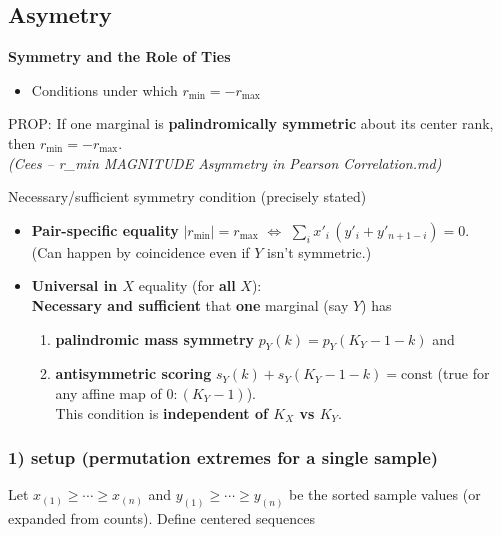 \documentclass[
  12pt,
]{article}
\providecommand{\tightlist}{%
  \setlength{\itemsep}{0pt}\setlength{\parskip}{0pt}}
\theoremstyle{plain}
\theoremstyle{definition}
\theoremstyle{remark}
\begin{document}
\subsection{Asymetry}\label{asymetry}

\textbf{Symmetry and the Role of Ties}

\begin{itemize}
\tightlist
\item
  Conditions under which \(r_{\min} = -r_{\max}\)
\end{itemize}

PROP: If one marginal is \textbf{palindromically symmetric} about its
center rank, then \(r_{\min} = -r_{\max}\).\\
\emph{(Cees -- r\_min MAGNITUDE Asymmetry in Pearson Correlation.md)}

Necessary/sufficient symmetry condition (precisely stated)

\begin{itemize}
\tightlist
\item
  \textbf{Pair-specific equality} \(|r_{\min}|=r_{\max}\) \(\iff\)
  \(\sum_i x'_i\,(y'_i+y'_{n+1-i})=0\).\\
  (Can happen by coincidence even if \(Y\) isn't symmetric.)
\item
  \textbf{Universal in \(X\)} equality (for \textbf{all} \(X\)):\\
  \textbf{Necessary and sufficient} that \textbf{one} marginal (say
  \(Y\)) has

  \begin{enumerate}
  \def\labelenumi{(\roman{enumi})}
  \tightlist
  \item
    \textbf{palindromic mass symmetry} \(p_Y(k)=p_Y(K_Y-1-k)\) and\\
  \item
    \textbf{antisymmetric scoring} \(s_Y(k)+s_Y(K_Y-1-k)=\text{const}\)
    (true for any affine map of \(0{:}(K_Y-1)\)).\\
    This condition is \textbf{independent of \(K_X\) vs \(K_Y\)}.
  \end{enumerate}
\end{itemize}

\subsubsection{1) setup (permutation extremes for a single
sample)}\label{setup-permutation-extremes-for-a-single-sample}

Let \(x_{(1)}\ge\cdots\ge x_{(n)}\) and \(y_{(1)}\ge\cdots\ge y_{(n)}\)
be the sorted sample values (or expanded from counts). Define centered
sequences
\end{document}
